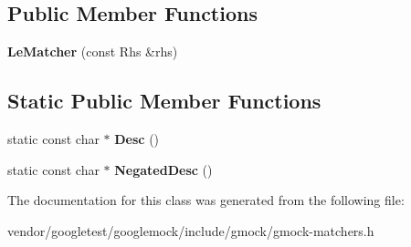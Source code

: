 \subsection*{Public Member Functions}
\begin{DoxyCompactItemize}
\item 
{\bfseries Le\+Matcher} (const Rhs \&rhs)\hypertarget{classtesting_1_1internal_1_1LeMatcher_ae3dce3765263397fa5de202d45d0bdb5}{}\label{classtesting_1_1internal_1_1LeMatcher_ae3dce3765263397fa5de202d45d0bdb5}

\end{DoxyCompactItemize}
\subsection*{Static Public Member Functions}
\begin{DoxyCompactItemize}
\item 
static const char $\ast$ {\bfseries Desc} ()\hypertarget{classtesting_1_1internal_1_1LeMatcher_adfef0084cb0f28503a40d7157699519b}{}\label{classtesting_1_1internal_1_1LeMatcher_adfef0084cb0f28503a40d7157699519b}

\item 
static const char $\ast$ {\bfseries Negated\+Desc} ()\hypertarget{classtesting_1_1internal_1_1LeMatcher_a01dada192b6f7139b66bbc198b3cb03b}{}\label{classtesting_1_1internal_1_1LeMatcher_a01dada192b6f7139b66bbc198b3cb03b}

\end{DoxyCompactItemize}


The documentation for this class was generated from the following file\+:\begin{DoxyCompactItemize}
\item 
vendor/googletest/googlemock/include/gmock/gmock-\/matchers.\+h\end{DoxyCompactItemize}
